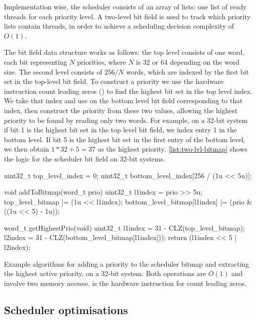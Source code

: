 Implementation wise, the scheduler consists of an array of lists: one list of ready threads for each
priority level. A two-level bit field is used to track which priority lists contain threads, 
in order to achieve a scheduling decision complexity of $O(1)$. 

The bit field data structure works as follows: the
top level consists of one word, each bit representing $N$ priorities, where $N$ is 32 or 64
depending on the word size. The second level consists of $256/N$ words, which are indexed by the first bit set in the
top-level bit field. To construct a priority we use the hardware instruction count leading zeros
() to find the highest bit set in the top level index. We take that index and use
 on the bottom level bit field corresponding to that index, then construct the priority
from these two values, allowing the highest priority to be found by reading only two words. For
example, on a 32-bit system 
if bit 1 is the highest bit set in the top level bit field, we index entry 1 in the
bottom level. If bit 5 is the highest bit set in the first entry of the bottom level, we then obtain
$ 1 * 32 + 5 = 37$ as the highest priority. 
\cref{list:two-lvl-bitmap} shows the logic for the scheduler bit field on 32-bit systems.

\begin{listing}
    \begin{ccode}
uint32_t top_level_index = 0;
uint32_t bottom_level_index[256 / (1u << 5u)];

void addToBitmap(word_t prio) {
    uint32_t l1index = prio >> 5u;
    top_level_bitmap |= (1u << l1index);
    bottom_level_bitmap[l1index] |= (prio & ((1u << 5) - 1u));
}

word_t getHighestPrio(void) {
    uint32_t l1index = 31 - CLZ(top_level_bitmap);
    l2index = 31 - CLZ(bottom_level_bitmap[l1index]));
    return (l1index << 5 | l2index);
}
    \end{ccode}
    \caption{Example algorithms for adding a priority to the scheduler bitmap and extracting the highest
        active priority, on a 32-bit system. Both operations are $O(1)$ and involve two memory accesse. 
     is the hardware instruction for count leading zeros.}
    \label{list:two-lvl-bitmap}
\end{listing}

\subsection{Scheduler optimisations}

